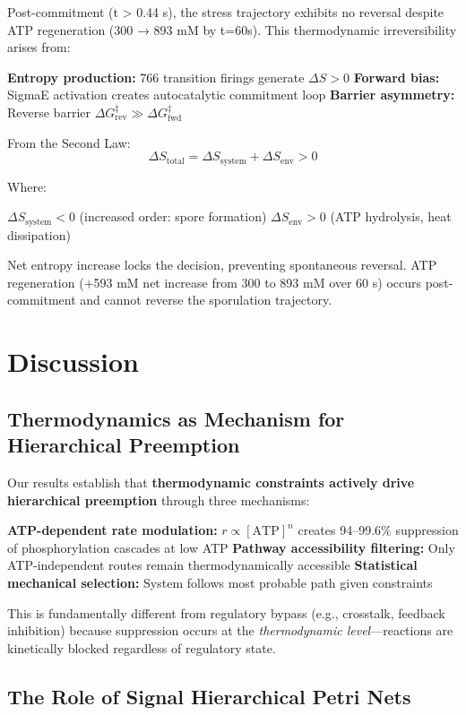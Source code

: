 \documentclass[twocolumn,11pt]{article}
\begin{document}
Post-commitment (t > 0.44 s), the stress trajectory exhibits no reversal despite ATP regeneration (300 → 893 mM by t=60s). This thermodynamic irreversibility arises from:


\textbf{Entropy production:} 766 transition firings generate $\Delta S > 0$
\textbf{Forward bias:} SigmaE activation creates autocatalytic commitment loop
\textbf{Barrier asymmetry:} Reverse barrier $\Delta G^\ddagger_{\text{rev}} \gg \Delta G^\ddagger_{\text{fwd}}$


From the Second Law:
\begin{equation}
    \Delta S_{\text{total}} = \Delta S_{\text{system}} + \Delta S_{\text{env}} > 0
\end{equation}

Where:

$\Delta S_{\text{system}} < 0$ (increased order: spore formation)
$\Delta S_{\text{env}} > 0$ (ATP hydrolysis, heat dissipation)


Net entropy increase locks the decision, preventing spontaneous reversal. ATP regeneration (+593 mM net increase from 300 to 893 mM over 60 s) occurs post-commitment and cannot reverse the sporulation trajectory.

\section{Discussion}

\subsection{Thermodynamics as Mechanism for Hierarchical Preemption}

Our results establish that \textbf{thermodynamic constraints actively drive hierarchical preemption} through three mechanisms:


\textbf{ATP-dependent rate modulation:} $r \propto [\text{ATP}]^n$ creates 94--99.6\% suppression of phosphorylation cascades at low ATP
\textbf{Pathway accessibility filtering:} Only ATP-independent routes remain thermodynamically accessible
\textbf{Statistical mechanical selection:} System follows most probable path given constraints


This is fundamentally different from regulatory bypass (e.g., crosstalk, feedback inhibition) because suppression occurs at the \textit{thermodynamic level}—reactions are kinetically blocked regardless of regulatory state.

\subsection{The Role of Signal Hierarchical Petri Nets}
\end{document}
